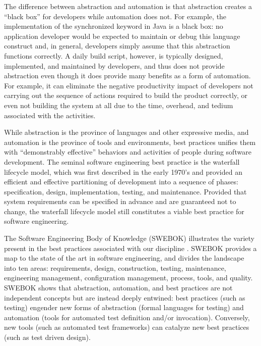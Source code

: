 The difference between abstraction and automation is that abstraction
creates a ``black box'' for developers while automation does not. For
example, the implementation of the synchronized keyword in Java is a black
box: no application developer would be expected to maintain or debug this
language construct and, in general, developers simply assume that this
abstraction functions correctly.  A daily build script, however, is
typically designed, implemented, and maintained by developers, and thus
does not provide abstraction even though it does provide many benefits as a
form of automation. For example, it can eliminate the negative productivity
impact of developers not carrying out the sequence of actions required to
build the product correctly, or even not building the system at all due to
the time, overhead, and tedium associated with the activities.

While abstraction is the province of languages and other expressive media,
and automation is the province of tools and environments, best
practices unifies them with ``demonstrably effective'' behaviors and
activities of people during software development.  The seminal software
engineering best practice is the waterfall lifecycle model, which was first
described in the early 1970's and provided an efficient and effective
partitioning of development into a sequence of phases: specification,
design, implementation, testing, and maintenance.  Provided that system
requirements can be specified in advance and are guaranteed not to change,
the waterfall lifecycle model still constitutes a viable best practice for
software engineering.

The Software Engineering Body of Knowledge (SWEBOK) illustrates the variety
present in the best practices associated with our discipline
\cite{Abran05}.  SWEBOK provides a map to the state of the art in software
engineering, and divides the landscape into ten areas: requirements,
design, construction, testing, maintenance, engineering management,
configuration management, process, tools, and quality.  SWEBOK shows that
abstraction, automation, and best practices are not independent concepts
but are instead deeply entwined: best practices (such as testing) engender
new forms of abstraction (formal languages for testing) and automation
(tools for automated test definition and/or invocation). Conversely, new
tools (such as automated test frameworks) can catalyze new best practices
(such as test driven design).

